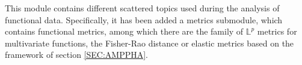 
This module contains different scattered topics used during the analysis of
functional data. Specifically, it has been added a metrics submodule, which
contains functional metrics, among which there are the family of $\mathbb{L}^p$
metrics for multivariate functions, the Fisher-Rao distance or elastic metrics
based on the framework of section \ref{SEC:AMPPHA}.
